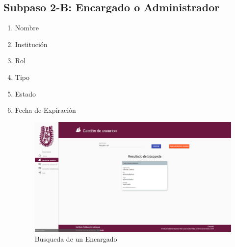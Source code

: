 \subsection{Subpaso 2-B: Encargado o Administrador}
\begin{enumerate}
	\item Nombre
	\item Institución
	\item Rol
	\item Tipo
	\item Estado
	\item Fecha de Expiración
	
	\begin{figure}[hbtp]
		
		\includegraphics[scale=0.3]
		{images/Interfaz/IUGS22_EncargadoBusquedaEncargado.png}
		\caption{Busqueda de un Encargado}
	\end{figure} 
\end{enumerate}

